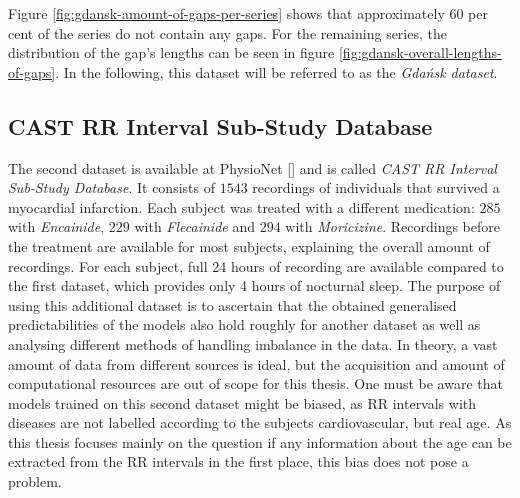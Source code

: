 \documentclass[11pt]{scrartcl}
\begin{document}
Figure \ref{fig:gdansk-amount-of-gaps-per-series} shows that approximately 60 per cent of the series do not contain any gaps. For the remaining series, the distribution of the gap's lengths can be seen in figure \ref{fig:gdansk-overall-lengths-of-gaps}. In the following, this dataset will be referred to as the \textit{Gdańsk dataset}.

\subsection{CAST RR Interval Sub-Study Database}

The second dataset is available at PhysioNet [\cite{physionet}] and is called \textit{CAST RR Interval Sub-Study Database}. It consists of $1543$ recordings of individuals that survived a myocardial infarction. Each subject was treated with a different medication: $285$ with \textit{Encainide}, $229$ with  \textit{Flecainide} and $294$ with \textit{Moricizine}. Recordings before the treatment are available for most subjects, explaining the overall amount of recordings. For each subject, full 24 hours of recording are available compared to the first dataset, which provides only 4 hours of nocturnal sleep. The purpose of using this additional dataset is to ascertain that the obtained generalised predictabilities of the models also hold roughly for another dataset as well as analysing different methods of handling imbalance in the data. In theory, a vast amount of data from different sources is ideal, but the acquisition and amount of computational resources are out of scope for this thesis. One must be aware that models trained on this second dataset might be biased, as RR intervals with diseases are not labelled according to the subjects cardiovascular, but real age. As this thesis focuses mainly on the question if any information about the age can be extracted from the RR intervals in the first place, this bias does not pose a problem.
\end{document}
